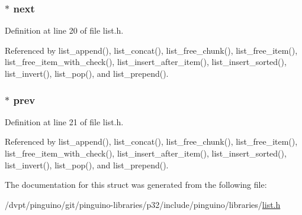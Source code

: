 \hypertarget{struct___list_a4ce5a16aaa87ace3fe65509ecb2674f8}{
\subsubsection[{next}]{$\ast$ next}}\label{struct___list_a4ce5a16aaa87ace3fe65509ecb2674f8}


Definition at line 20 of file list.\-h.



Referenced by list\-\_\-append(), list\-\_\-concat(), list\-\_\-free\-\_\-chunk(), list\-\_\-free\-\_\-item(), list\-\_\-free\-\_\-item\-\_\-with\-\_\-check(), list\-\_\-insert\-\_\-after\-\_\-item(), list\-\_\-insert\-\_\-sorted(), list\-\_\-invert(), list\-\_\-pop(), and list\-\_\-prepend().

\hypertarget{struct___list_ae84fd4e35313c1038991696042d588a4}{
\subsubsection[{prev}]{$\ast$ prev}}\label{struct___list_ae84fd4e35313c1038991696042d588a4}


Definition at line 21 of file list.\-h.



Referenced by list\-\_\-append(), list\-\_\-concat(), list\-\_\-free\-\_\-chunk(), list\-\_\-free\-\_\-item(), list\-\_\-free\-\_\-item\-\_\-with\-\_\-check(), list\-\_\-insert\-\_\-after\-\_\-item(), list\-\_\-insert\-\_\-sorted(), list\-\_\-invert(), list\-\_\-pop(), and list\-\_\-prepend().



The documentation for this struct was generated from the following file\-:\begin{DoxyCompactItemize}
\item 
/dvpt/pinguino/git/pinguino-\/libraries/p32/include/pinguino/libraries/\hyperlink{list_8h}{list.\-h}\end{DoxyCompactItemize}
